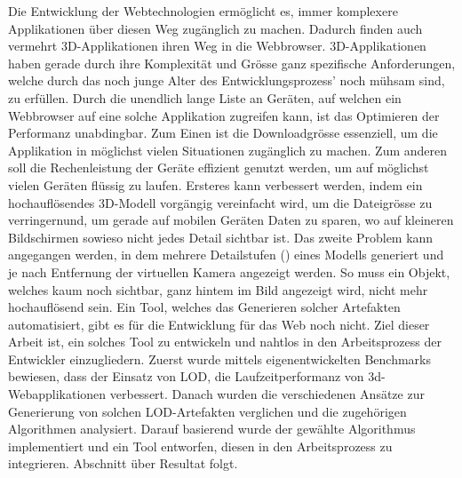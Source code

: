 Die Entwicklung der Webtechnologien ermöglicht es, immer komplexere Applikationen über diesen Weg zugänglich zu machen. Dadurch finden auch vermehrt 3D-Applikationen ihren Weg in die Webbrowser.
3D-Applikationen haben gerade durch ihre Komplexität und Grösse ganz spezifische Anforderungen, welche durch das noch junge Alter des Entwicklungsprozess' noch mühsam sind, zu erfüllen.
Durch die unendlich lange Liste an Geräten, auf welchen ein Webbrowser auf eine solche Applikation zugreifen kann, ist das Optimieren der Performanz unabdingbar.
Zum Einen ist die Downloadgrösse essenziell, um die Applikation in möglichst vielen Situationen zugänglich zu machen. Zum anderen soll die Rechenleistung der Geräte effizient genutzt werden, um auf möglichst vielen Geräten flüssig zu laufen.
Ersteres kann verbessert werden, indem ein hochauflösendes 3D-Modell vorgängig vereinfacht wird, um die Dateigrösse zu verringernund, um gerade auf mobilen Geräten Daten zu sparen, wo auf kleineren Bildschirmen sowieso nicht jedes Detail sichtbar ist.
Das zweite Problem kann angegangen werden, in dem mehrere Detailstufen () eines Modells generiert und je nach Entfernung der virtuellen Kamera angezeigt werden. So muss ein Objekt, welches kaum noch sichtbar, ganz hintem im Bild angezeigt wird, nicht mehr hochauflösend sein.
Ein Tool, welches das Generieren solcher Artefakten automatisiert, gibt es für die Entwicklung für das Web noch nicht.
Ziel dieser Arbeit ist, ein solches Tool zu entwickeln und nahtlos in den Arbeitsprozess der Entwickler einzugliedern.
\bigbreak
Zuerst wurde mittels eigenentwickelten Benchmarks bewiesen, dass der Einsatz von LOD, die Laufzeitperformanz von 3d-Webapplikationen verbessert.
Danach wurden die verschiedenen Ansätze zur Generierung von solchen LOD-Artefakten verglichen und die zugehörigen Algorithmen analysiert.
Darauf basierend wurde der gewählte Algorithmus implementiert und ein Tool entworfen, diesen in den Arbeitsprozess zu integrieren.
\bigbreak
Abschnitt über Resultat folgt.